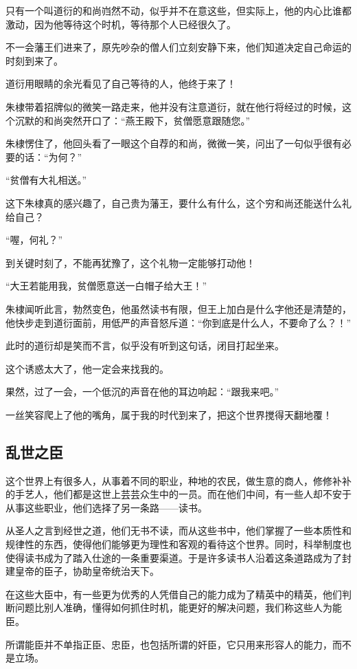 \begin{multicols}{\theparacolNo}
		只有一个叫道衍的和尚岿然不动，似乎并不在意这些，但实际上，他的内心比谁都激动，因为他等待这个时机，等待那个人已经很久了。

		不一会藩王们进来了，原先吵杂的僧人们立刻安静下来，他们知道决定自己命运的时刻到来了。

		道衍用眼睛的余光看见了自己等待的人，他终于来了！

		朱棣带着招牌似的微笑一路走来，他并没有注意道衍，就在他行将经过的时候，这个沉默的和尚突然开口了：“燕王殿下，贫僧愿意跟随您。”

		朱棣愣住了，他回头看了一眼这个自荐的和尚，微微一笑，问出了一句似乎很有必要的话：“为何？”

		“贫僧有大礼相送。”

		这下朱棣真的感兴趣了，自己贵为藩王，要什么有什么，这个穷和尚还能送什么礼给自己？

		“喔，何礼？”

		到关键时刻了，不能再犹豫了，这个礼物一定能够打动他！

		“大王若能用我，贫僧愿意送一白帽子给大王！”

		朱棣闻听此言，勃然变色，他虽然读书有限，但王上加白是什么字他还是清楚的，他快步走到道衍面前，用低严的声音怒斥道：“你到底是什么人，不要命了么？！”

		此时的道衍却是笑而不言，似乎没有听到这句话，闭目打起坐来。

		这个诱惑太大了，他一定会来找我的。

		果然，过了一会，一个低沉的声音在他的耳边响起：“跟我来吧。”

		一丝笑容爬上了他的嘴角，属于我的时代到来了，把这个世界搅得天翻地覆！

		\subsection{乱世之臣}
		这个世界上有很多人，从事着不同的职业，种地的农民，做生意的商人，修修补补的手艺人，他们都是这世上芸芸众生中的一员。而在他们中间，有一些人却不安于从事这些职业，他们选择了另一条路——读书。

		从圣人之言到经世之道，他们无书不读，而从这些书中，他们掌握了一些本质性和规律性的东西，使得他们能够更为理性和客观的看待这个世界。同时，科举制度也使得读书成为了踏入仕途的一条重要渠道。于是许多读书人沿着这条道路成为了封建皇帝的臣子，协助皇帝统治天下。

		在这些大臣中，有一些更为优秀的人凭借自己的能力成为了精英中的精英，他们判断问题比别人准确，懂得如何抓住时机，能更好的解决问题，我们称这些人为能臣。

		所谓能臣并不单指正臣、忠臣，也包括所谓的奸臣，它只用来形容人的能力，而不是立场。


\end{multicols}
